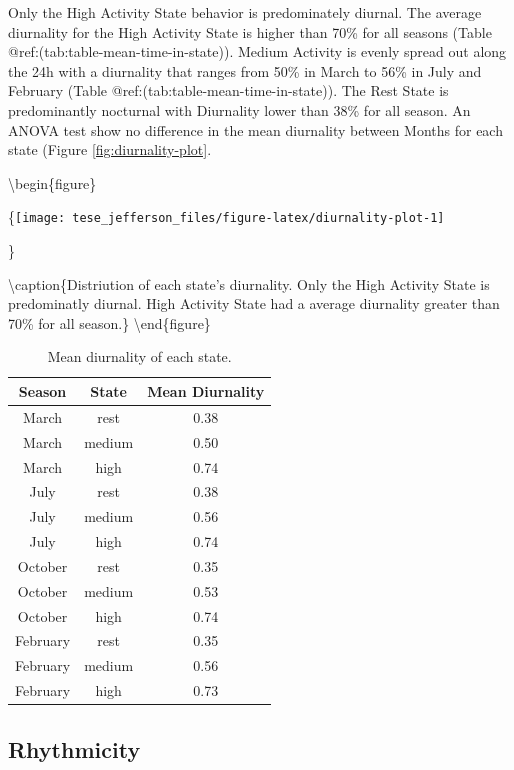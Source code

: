\documentclass[english,msc,numbers,hidelinks]{coppe}
\begin{document}
  Only the High Activity State behavior is predominately diurnal. The average diurnality for the High Activity State is higher than 70\% for all seasons (Table @ref:(tab:table-mean-time-in-state)). Medium Activity is evenly spread out along the 24h with a diurnality that ranges from 50\% in March to 56\% in July and February (Table @ref:(tab:table-mean-time-in-state)). The Rest State is predominantly nocturnal with Diurnality lower than 38\% for all season. An ANOVA test show no difference in the mean diurnality between Months for each state (Figure \ref{fig:diurnality-plot}.

  \textbackslash begin\{figure\}

  \{\centering \texttt{[image: tese\_jefferson\_files/figure-latex/diurnality-plot-1]}

  \}

  \textbackslash caption\{Distriution of each state's diurnality. Only the High Activity State is predominatly diurnal. High Activity State had a average diurnality greater than 70\% for all season.\}\label{fig:diurnality-plot}
  \textbackslash end\{figure\}
  \begin{table}[!h]

  \caption{\label{tab:table-mean-time-in-state}Mean diurnality of each state.}
  \centering
  \begin{tabular}[t]{ccc}
  \toprule
  Season & State & Mean Diurnality\\
  \midrule
  March & rest & 0.38\\
  March & medium & 0.50\\
  March & high & 0.74\\
  July & rest & 0.38\\
  July & medium & 0.56\\
  \addlinespace
  July & high & 0.74\\
  October & rest & 0.35\\
  October & medium & 0.53\\
  October & high & 0.74\\
  February & rest & 0.35\\
  \addlinespace
  February & medium & 0.56\\
  February & high & 0.73\\
  \bottomrule
  \end{tabular}
  \end{table}
  \hypertarget{rhythmicity}{%
  \subsection{Rhythmicity}\label{rhythmicity}}
\end{document}
